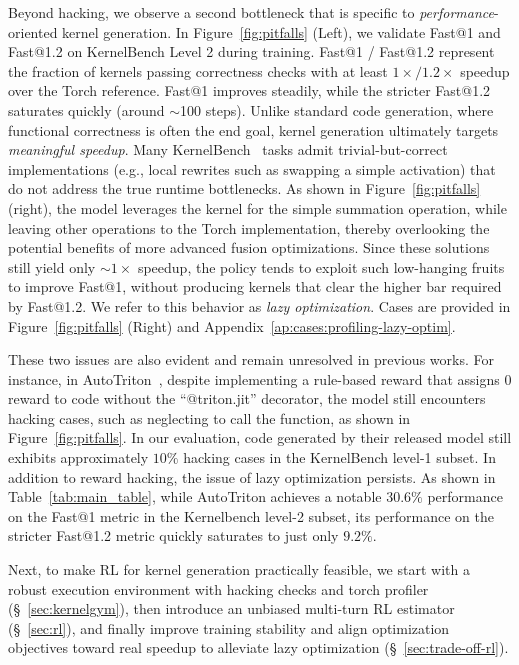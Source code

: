 Beyond hacking, we observe a second bottleneck that is specific to \emph{performance}-oriented kernel generation. In Figure~\ref{fig:pitfalls} (Left), we validate Fast@1 and Fast@1.2 on KernelBench Level 2 during training. Fast@1 / Fast@1.2 represent the fraction of kernels passing correctness checks with at least $1\times / 1.2\times$ speedup over the Torch reference. Fast@1 improves steadily, while the stricter Fast@1.2 saturates quickly (around $\sim$100 steps). Unlike standard code generation, where functional correctness is often the end goal, kernel generation ultimately targets \emph{meaningful speedup}. Many KernelBench~\citep{ouyang2025kernelbench} tasks admit trivial-but-correct implementations (e.g., local rewrites such as swapping a simple activation) that do not address the true runtime bottlenecks. As shown in Figure~\ref{fig:pitfalls} (right), the model leverages the kernel for the simple summation operation, while leaving other operations to the Torch implementation, thereby overlooking the potential benefits of more advanced fusion optimizations. Since these solutions still yield only $\sim1\times$ speedup, the policy tends to exploit such low-hanging fruits to improve Fast@1, without producing kernels that clear the higher bar required by Fast@1.2. We refer to this behavior as \emph{lazy optimization}. Cases are provided in Figure~\ref{fig:pitfalls} (Right) and Appendix~\ref{ap:cases:profiling-lazy-optim}.

 These two issues are also evident and remain unresolved in previous works. For instance, in AutoTriton~\citep{li2025autotriton}, despite implementing a rule-based reward that assigns 0 reward to code without the ``@triton.jit'' decorator, the model still encounters hacking cases, such as neglecting to call the function, as shown in Figure~\ref{fig:pitfalls}. In our evaluation, code generated by their released model still exhibits approximately $10\%$ hacking cases in the KernelBench level-1 subset. In addition to reward hacking, the issue of lazy optimization persists. As shown in Table~\ref{tab:main_table}, while AutoTriton achieves a notable $30.6\%$ performance on the Fast@1 metric in the Kernelbench level-2 subset, its performance on the stricter Fast@1.2 metric quickly saturates to just only $9.2\%$.

Next, to make RL for kernel generation practically feasible, we start with a robust execution environment with hacking checks and torch profiler (\S~\ref{sec:kernelgym}), then introduce an unbiased multi-turn RL estimator (\S~\ref{sec:rl}), and finally improve training stability and align optimization objectives toward real speedup to alleviate lazy optimization (\S~\ref{sec:trade-off-rl}).